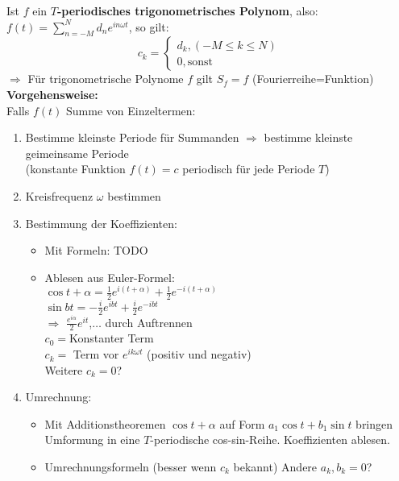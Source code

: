 \documentclass[nocolor,german]{latex4ei/latex4ei_sheet}
\begin{document}
Ist $f$ ein \textbf{$T$-periodisches trigonometrisches Polynom}, also:\\
$f(t)=\sum_{n=-M}^N d_n e^{i n \omega t}$, so gilt:\\
\[c_k=\begin{cases} d_k, (-M \le k \le N) \\ 0 , \mathrm{sonst} \end{cases}\]
	$\Rightarrow$ F\"ur trigonometrische Polynome $f$ gilt $S_f=f$ (Fourierreihe=Funktion)\\
\textbf{Vorgehensweise:}\\
Falls $f(t)$ Summe von Einzeltermen:\\
\begin{enumerate}
	\item Bestimme kleinste Periode f\"ur Summanden $\Rightarrow$ bestimme kleinste geimeinsame Periode\\
		(konstante Funktion $f(t)=c$ periodisch f\"ur jede Periode $T$)\\
	\item Kreisfrequenz $\omega$ bestimmen
	\item Bestimmung der Koeffizienten:
		\begin{itemize}
			\item Mit Formeln: TODO
			\item Ablesen aus Euler-Formel:\\
				$\cos{t+\alpha}=\frac{1}{2}e^{i (t+\alpha)}+\frac{1}{2} e^{- i (t+\alpha)}$\\
				$\sin{b t}=-\frac{i}{2} e^{i b t}+\frac{i}{2} e^{-i b t}$\\
				$\Rightarrow$ $\frac{e^{i \alpha}}{2} e^{i t}$,$\ldots$ durch Auftrennen\\
				$c_0=$Konstanter Term\\
				$c_k=$ Term vor $e^{i k \omega t}$ (positiv und negativ)\\
				Weitere $c_k=0$?
		\end{itemize}
	\item Umrechnung:\\
		\begin{itemize}
			\item Mit Additionstheoremen $\cos{t+\alpha}$ auf Form $a_1 \cos{t} + b_1 \sin{t}$ bringen\\
				Umformung in eine $T$-periodische cos-sin-Reihe. Koeffizienten ablesen.
			\item Umrechnungsformeln (besser wenn $c_k$ bekannt) Andere $a_k,b_k=0$?
		\end{itemize}
\end{enumerate}
\end{document}
